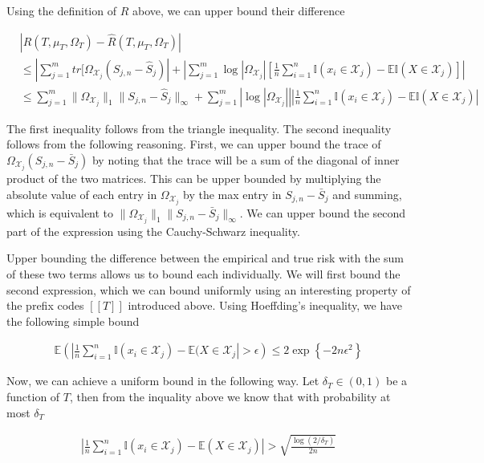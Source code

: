 Using the definition of $R$ above, we can upper bound their difference

\begin{align}
  &\left| R(T,\mu_T,\Omega_T) - \hat{R}(T, \mu_T, \Omega_T) \right| \\
  &\le \left| \sum_{j=1}^m tr[\Omega_{\mathcal{X}_j} (S_{j,n} - \hat{S}_j) \right| + 
  \left|
    \sum_{j=1}^m \log|\Omega_{\mathcal{X}_j}|
    \left[
      \frac{1}{n} \sum_{i=1}^n \mathbb{I}(x_i \in \mathcal{X}_j) - \mathbb{E I} (X \in \mathcal{X}_j)
    \right]
  \right| \\
  &\le \sum_{j=1}^m \|\Omega_{\mathcal{X}_j}\|_1 \|S_{j,n} - \hat{S}_j\|_\infty + 
  \sum_{j=1}^m \left| \log|\Omega_{\mathcal{X}_j}| \right|
  \left|
    \frac{1}{n} \sum_{i=1}^n \mathbb{I}(x_i \in \mathcal{X}_j) - \mathbb{E I} (X \in \mathcal{X}_j)
  \right|
\end{align}

The first inequality follows from the triangle inequality. The second
inequality follows from the following reasoning. First, we can upper
bound the trace of $\Omega_{\mathcal{X}_j} (S_{j,n} - \bar{S}_j)$ by
noting that the trace will be a sum of the diagonal of inner product
of the two matrices. This can be upper bounded by multiplying the
absolute value of each entry in $\Omega_{\mathcal{X}_j}$ by the max
entry in $S_{j,n} - \bar{S}_j$ and summing, which is equivalent to
$\|\Omega_{\mathcal{X}_j}\|_1 \|S_{j,n} - \bar{S}_j\|_\infty$. We can
upper bound the second part of the expression using the Cauchy-Schwarz
inequality.

Upper bounding the difference between the empirical and true risk with
the sum of these two terms allows us to bound each individually. We
will first bound the second expression, which we can bound uniformly
using an interesting property of the prefix codes $[[T]]$ introduced
above. Using Hoeffding's inequality, we have the following simple
bound

\begin{align}
  \mathbb{E} \left(
    \left| \frac{1}{n} \sum_{i=1}^n \mathbb{I}(x_i \in \mathcal{X}_j) - 
      \mathbb{E}(X \in \mathcal{X}_j \right| > \epsilon
  \right)
  \le 2 \exp \left\{ - 2 n \epsilon^2 \right\}
\end{align}

Now, we can achieve a uniform bound in the following way. Let
$\delta_T \in (0,1)$ be a function of $T$, then from the inquality
above we know that with probability at most $\delta_T$

\begin{align}
    \left| \frac{1}{n} \sum_{i=1}^n \mathbb{I}(x_i \in \mathcal{X}_j) - 
      \mathbb{E}(X \in \mathcal{X}_j)
    \right|
    > \sqrt{\frac{\log(2/\delta_T)}{2n}}
\end{align}

